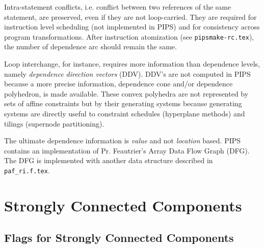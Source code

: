 Intra-statement conflicts, i.e. conflict between two references of the
same statement, are preserved, even if they are not loop-carried. They
are required for instruction level scheduling (not implemented in PIPS)
and for consistency across program transformations. After instruction
atomization (see \verb/pipsmake-rc.tex/), the number of dependence arc
should remain the same.

Loop interchange, for instance, requires more information than
dependence levels, namely {\em dependence direction vectors}
(DDV). DDV's are not computed in PIPS because a more precise
information, dependence cone and/or dependence polyhedron, is made
available. These convex polyhedra are not represented by sets of affine
constraints but by their generating systems because generating systems
are directly useful to constraint schedules (hyperplane methods) and
tilings (supernode partitioning).

The ultimate dependence information is {\em value} and not {\em
location} based. PIPS contains an implementation of Pr. Feautrier's
Array Data Flow Graph (DFG). The DFG is implemented with another data
structure described in \verb/paf_ri.f.tex/.

\begin{comment}
Le domaine co^ne de'finit une approximation polye'drique de l'ensemble
des de'pendances porte'es par un arc. Plusieurs types d'approximation
sont possibles: les niveaux de de'pendance, les vecteurs de direction de
de'pendance, les syste`mes ge'ne'rateurs (aussi
connus sous le nom de {\em co^ne de de'pendance}) et le me'canisme
du {\em Data Flow Graph} n'est pas imple'mente' avec cette structure
de donne'es mais avec \verb|paf_ri|.
\end{comment}

\begin{comment}
Le niveau d'une de'pendance d\'ecrivent le nombre de boucles englobantes
concerne\'ees.  ``{generating\_system}'' est la r\'epresentation de
system generateur.
\end{comment}

\section{Strongly Connected Components}
\label{section-strongly-connected-components}

\subsection{Flags for Strongly Connected Components}

